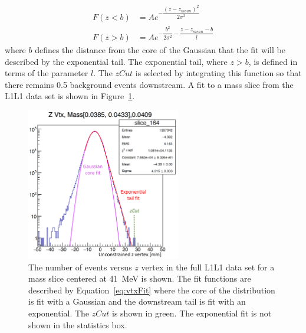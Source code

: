 \begin{equation}
\label{eq:vtxFit}
\begin{split}
F(z < b) & =  Ae^{-\dfrac{(z-z_{mean})^2}{2\sigma^2}}\\
F(z > b) & =  Ae^{-\dfrac{b^2}{2\sigma^2}-\dfrac{z-z_{mean}-b}{l}}
\end{split}
\end{equation}
where $b$ defines the distance from the core of the Gaussian that the fit will be described by the exponential tail. The exponential tail, where $z>b$, is defined in terms of the parameter $l$. The $zCut$ is selected by integrating this function so that there remains 0.5 background events downstream. A fit to a mass slice from the L1L1 data set is shown in Figure~\ref{fig:vtxFitPic}.

\begin{figure}[htb]
  \centering
      \includegraphics[width=0.6\textwidth]{pics/searching/vtxFit.png}
  \caption[Fit to vertex slice at a mass of 41~MeV]{The number of events versus $z$ vertex in the full L1L1 data set for a mass slice centered at 41~MeV is shown. The fit functions are described by Equation~\eqref{eq:vtxFit} where the core of the distribution is fit with a Gaussian and the downstream tail is fit with an exponential. The $zCut$ is shown in green. The exponential fit is not shown in the statistics box.}
  \label{fig:vtxFitPic}
\end{figure} 

